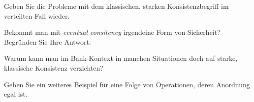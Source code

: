 \begin{fragen}
	\begin{enumeration}
		\item Geben Sie die Probleme mit dem klassischen, starken Konsistenzbegriff im verteilten Fall wieder.
		\item Bekommt man mit \emph{eventual consitency} irgendeine Form von Sicherheit? Begründen Sie Ihre Antwort.
		\item Warum kann man im Bank-Kontext in manchen Situationen doch auf starke, klassische Konsistenz verzichten?
		\item Geben Sie ein weiteres Beispiel für eine Folge von Operationen, deren Anordnung egal ist.
	\end{enumeration}
\end{fragen}